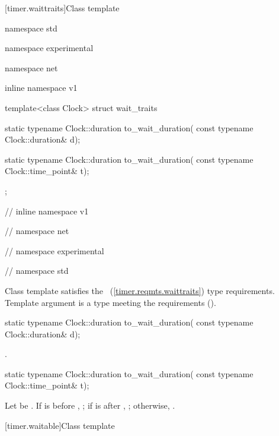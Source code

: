 [timer.waittraits]{Class template }

\begin{codeblock}
namespace std {
namespace experimental {
namespace net {
inline namespace v1 {

  template<class Clock>
  struct wait_traits
  {
    static typename Clock::duration to_wait_duration(
      const typename Clock::duration& d);

    static typename Clock::duration to_wait_duration(
      const typename Clock::time_point& t);
  };

} // inline namespace v1
} // namespace net
} // namespace experimental
} // namespace std
\end{codeblock}

\pnum
Class template  satisfies the ~(\ref{timer.reqmts.waittraits}) type requirements. Template argument  is a type meeting the  requirements ().

\begin{itemdecl}
static typename Clock::duration to_wait_duration(
  const typename Clock::duration& d);
\end{itemdecl}

\begin{itemdescr}
\pnum
\returns {}.
\end{itemdescr}

\begin{itemdecl}
static typename Clock::duration to_wait_duration(
  const typename Clock::time_point& t);
\end{itemdecl}

\begin{itemdescr}
\pnum
\returns Let  be . If  is before , ; if  is after , ; otherwise, .
\end{itemdescr}


[timer.waitable]{Class template }

